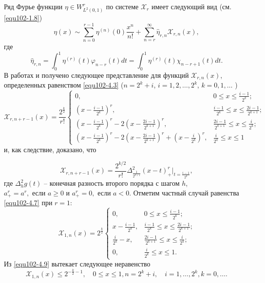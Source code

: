 Ряд Фурье функции $\eta\in W^r_{L^2(0,1)}$ по системе $\mathcal{ X}_r$ имеет следующий вид (см. \eqref{equ102-1.8})
  \begin{equation}\label{equ102-4.6}
\eta(x)\sim \sum_{n=0}^{r-1} \eta^{(n)}(0)\frac{x^n}{n!}+ \sum_{n=r}^\infty\hat \eta_{r,n}\mathcal{ X}_{r,n}(x),
\end{equation}
где
  $$
\hat \eta_{r,n}=\int_0^1 \eta^{(r)}(t)\varphi_{n-r}(t)dt=\int_0^1 \eta^{(r)}(t) \chi_{n-r+1}(t)dt.
$$
В работах \cite{Shar19} и \cite{Shar20}  получено  следующее представление для функций $\mathcal{ X}_{r,n}(x)$, определенных равенством \eqref{equ102-4.3}
 ($n=2^k+i$, $i=1,2,\ldots,2^k $, $k=0,1,\ldots$ )
  \begin{equation}\label{equ102-4.7}
 \mathcal{ X}_{r,n+r-1}(x)=\frac{2^{\frac{k}{2}}}{r!}
 \begin{cases} 0,&\text{$0\le x\le\frac{i-1}{2^k}$;}\\
 (x-\frac{i-1}{2^k})^r,&\text{$\frac{i-1}{2^k}\le x\le \frac{2i-1}{2^{k+1}}$;}\\
 (x-\frac{i-1}{2^k})^r-2(x-\frac{2i-1}{2^{k+1}})^r,&\text{$\frac{2i-1}{2^{k+1}}\le x\le \frac{i}{2^{k}}$;}\\
  (x-\frac{i-1}{2^k})^r-2(x-\frac{2i-1}{2^{k+1}})^r+(x-\frac{i}{2^{k}})^r, &\text{$\frac{i}{2^{k}}\le x\le1$}
   \end{cases}
  \end{equation}
 и, как следствие, доказано, что

   \begin{equation}\label{equ102-4.8}
 \mathcal{ X}_{r,n+r-1}(x)=\frac{2^{k/2}}{r!}\Delta^2_\frac{1}{2^{k+1}}(x-t)^r_+
 \big|_{t=\frac{i-1}{2^k}},
\end{equation}
где $\Delta^2_h g(t)$ -- конечная разность второго порядка с шагом $h$, $a_+^r=a^r, \text{ если } a\ge0 $ и $a_+^r=0, \text{ если } a<0 $. Отметим частный случай равенства \eqref{equ102-4.7} при $r=1$:
\begin{equation}\label{equ102-4.9}
 \mathcal{ X}_{1,n}(x)=2^{\frac{k}{2}}
 \begin{cases} 0,&\text{$0\le x\le\frac{i-1}{2^k}$;}\\
 x-\frac{i-1}{2^k},&\text{$\frac{i-1}{2^k}\le x\le \frac{2i-1}{2^{k+1}}$;}\\
 \frac{i}{2^{k}}-x,&\text{$\frac{2i-1}{2^{k+1}}\le x\le \frac{i}{2^{k}}$;}\\
  0, &\text{$\frac{i}{2^{k}}\le x\le1$}.
   \end{cases}
  \end{equation} Из \eqref{equ102-4.9} вытекает следующее неравенство
\begin{equation}\label{equ102-4.10}
 \mathcal{ X}_{1,n}(x)\le 2^{-\frac{k}{2}-1}, \quad 0\le x\le 1, n=2^k+i,\quad i=1,\ldots,2^k, k=0,\ldots.
  \end{equation}

